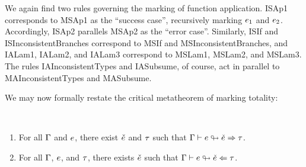 We again find two rules governing the marking of function application. ISAp1 corresponds to MSAp1 as
the ``success case'', recursively marking $e_1$ and $e_2$. Accordingly, ISAp2 parallels MSAp2
as the ``error case''. Similarly, ISIf and ISInconsistentBranches correspond to MSIf and
MSInconsistentBranches, and IALam1, IALam2, and IALam3 correspond to MSLam1, MSLam2, and MSLam3.
The rules IAInconsistentTypes and IASubsume, of course, act in parallel to MAInconsistentTypes and
MASubsume.

We may now formally restate the critical metatheorem of marking totality:
%
\begin{theorem}[name=Marking Totality] \
  \label{thm:calculus-marking-totality}
  \begin{enumerate}
    \item For all $\Gamma$ and $e$, there exist $\check{e}$ and $\tau$ such that
      $\Gamma \vdash e \looparrowright \check{e} \Rightarrow \tau$.
  \item For all $\Gamma$, $e$, and $\tau$, there exists $\check{e}$ such that
    $\Gamma \vdash e \looparrowright \check{e} \Leftarrow \tau$.
  \end{enumerate}
\end{theorem}

